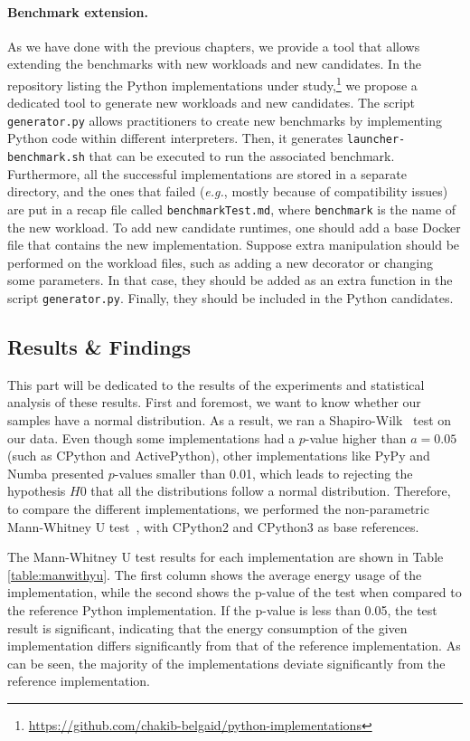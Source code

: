 \paragraph{Benchmark extension.}
As we have done with the previous chapters, we provide a tool that allows extending the benchmarks with new workloads and new candidates.
In the repository listing the Python implementations under study,\footnote{\url{https://github.com/chakib-belgaid/python-implementations}} we propose a dedicated tool to generate new workloads and new candidates.
The script \texttt{generator.py} allows practitioners to create new benchmarks by implementing Python code within different interpreters.
Then, it generates \texttt{launcher-benchmark.sh} that can be executed to run the associated benchmark.
Furthermore, all the successful implementations are stored in a separate directory, and the ones that failed (\emph{e.g.}, mostly because of compatibility issues) are put in a recap file called \texttt{benchmarkTest.md}, where \texttt{benchmark} is the name of the new workload.
To add new candidate runtimes, one should add a base Docker file that contains the new implementation. Suppose extra manipulation should be performed on the workload files, such as adding a new decorator or changing some parameters. In that case, they should be added as an extra function in the script \texttt{generator.py}.
Finally, they should be included in the Python candidates.

\subsection{Results \& Findings}
This part will be dedicated to the results of the experiments and statistical analysis of these results.
First and foremost, we want to know whether our samples have a normal distribution. As a result, we ran a Shapiro-Wilk~\cite{shapiro1968comparative} test on our data.
Even though some implementations had a $p$-value higher than $a=0.05$ (such as CPython and ActivePython), other implementations like PyPy and Numba presented $p$-values smaller than 0.01, which leads to rejecting the hypothesis $H0$ that all the distributions follow a normal distribution.
Therefore, to compare the different implementations, we performed the non-parametric Mann-Whitney U test~\cite{zimmerman1987comparative}, with CPython2 and CPython3 as base references.

The Mann-Whitney U test results for each implementation are shown in Table \ref{table:manwithyu}. The first column shows the average energy usage of the implementation, while the second shows the p-value of the test when compared to the reference Python implementation. If the p-value is less than 0.05, the test result is significant, indicating that the energy consumption of the given implementation differs significantly from that of the reference implementation.
As can be seen, the majority of the implementations deviate significantly from the reference implementation.



